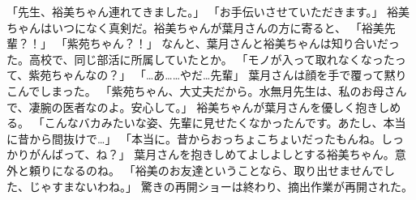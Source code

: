 「先生、裕美ちゃん連れてきました。」
「お手伝いさせていただきます。」
裕美ちゃんはいつになく真剣だ。裕美ちゃんが葉月さんの方に寄ると、
「裕美先輩？！」
「紫苑ちゃん？！」
なんと、葉月さんと裕美ちゃんは知り合いだった。高校で、同じ部活に所属していたとか。
「モノが入って取れなくなったって、紫苑ちゃんなの？」
「…あ……やだ…先輩」
葉月さんは顔を手で覆って黙りこんでしまった。
「紫苑ちゃん、大丈夫だから。水無月先生は、私のお母さんで、凄腕の医者なのよ。安心して。」
裕美ちゃんが葉月さんを優しく抱きしめる。
「こんなバカみたいな姿、先輩に見せたくなかったんです。あたし、本当に昔から間抜けで…」
「本当に。昔からおっちょこちょいだったもんね。しっかりがんばって、ね？」
葉月さんを抱きしめてよしよしとする裕美ちゃん。意外と頼りになるのね。
「裕美のお友達ということなら、取り出せませんでした、じゃすまないわね。」
驚きの再開ショーは終わり、摘出作業が再開された。

